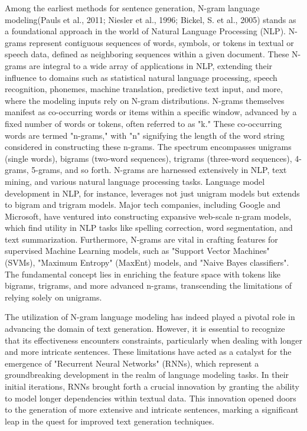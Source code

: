 \documentclass[fleqn,10pt]{thescipub} %
\begin{document}
Among the earliest methods for sentence generation, N-gram language modeling(Pauls et al., 2011; Niesler et al., 1996;  Bickel, S. et al., 2005) stands as a foundational approach in the world of Natural Language Processing (NLP). N-grams represent contiguous sequences of words, symbols, or tokens in textual or speech data, defined as neighboring sequences within a given document. These N-grams are integral to a wide array of applications in NLP, extending their influence to domains such as statistical natural language processing, speech recognition, phonemes, machine translation, predictive text input, and more, where the modeling inputs rely on N-gram distributions. N-grams themselves manifest as co-occurring words or items within a specific window, advanced by a fixed number of words or tokens, often referred to as "k." These co-occurring words are termed "n-grams," with "n" signifying the length of the word string considered in constructing these n-grams. The spectrum encompasses unigrams (single words), bigrams (two-word sequences), trigrams (three-word sequences), 4-grams, 5-grams, and so forth. N-grams are harnessed extensively in NLP, text mining, and various natural language processing tasks. Language model development in NLP, for instance, leverages not just unigram models but extends to bigram and trigram models. Major tech companies, including Google and Microsoft, have ventured into constructing expansive web-scale n-gram models, which find utility in NLP tasks like spelling correction, word segmentation, and text summarization. Furthermore, N-grams are vital in crafting features for supervised Machine Learning models, such as "Support Vector Machines" (SVMs), "Maximum Entropy" (MaxEnt) models, and "Naive Bayes classifiers". The fundamental concept lies in enriching the feature space with tokens like bigrams, trigrams, and more advanced n-grams, transcending the limitations of relying solely on unigrams.




The utilization of N-gram language modeling has indeed played a pivotal role in advancing the domain of text generation. However, it is essential to recognize that its effectiveness encounters constraints, particularly when dealing with longer and more intricate sentences. These limitations have acted as a catalyst for the emergence of "Recurrent Neural Networks" (RNNs), which represent a groundbreaking development in the realm of language modeling tasks. In their initial iterations, RNNs brought forth a crucial innovation by granting the ability to model longer dependencies within textual data. This innovation opened doors to the generation of more extensive and intricate sentences, marking a significant leap in the quest for improved text generation techniques.
\end{document}
